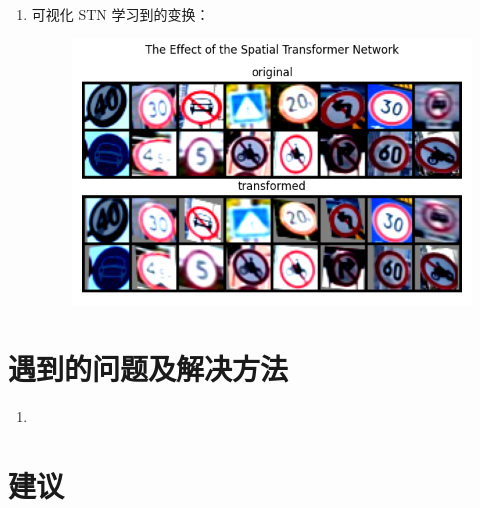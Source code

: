 \documentclass[a4paper]{article}
\begin{document}
\begin{enumerate}
\begin{enumerate}
        \item 可视化 STN 学习到的变换：
        \begin{figure}[H]
            \centering
            \includegraphics[width=0.65\linewidth]{../result/4_stn.png}
            \caption{}
        \end{figure}

    \end{enumerate}

    


\end{enumerate}


\section{遇到的问题及解决方法}
    \begin{enumerate}
        \item 
    \end{enumerate}

\section{建议}
\end{document}
